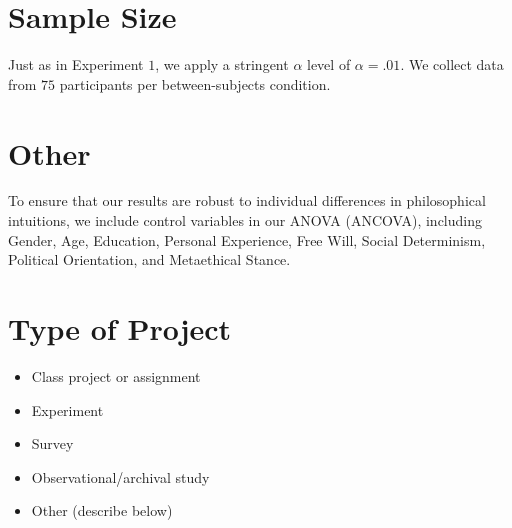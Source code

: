 \documentclass[scrarticle]{scrartcl}
\begin{document}
\section{Sample Size}
Just as in Experiment $1$, we apply a stringent $\alpha$ level of $\alpha = .01$.
We collect data from $75$ participants per between-subjects condition.


\section{Other}
To ensure that our results are robust to individual differences in philosophical intuitions, we include control variables in our ANOVA (ANCOVA), including Gender, Age, Education, Personal Experience, Free Will, Social Determinism, Political Orientation, and Metaethical Stance.


\section{Type of Project}
\begin{itemize}[label=\Square,noitemsep]
   \item Class project or assignment
   \item[\XBox] Experiment
   \item Survey
   \item Observational/archival study
   \item Other (describe below)
\end{itemize}
\end{document}
